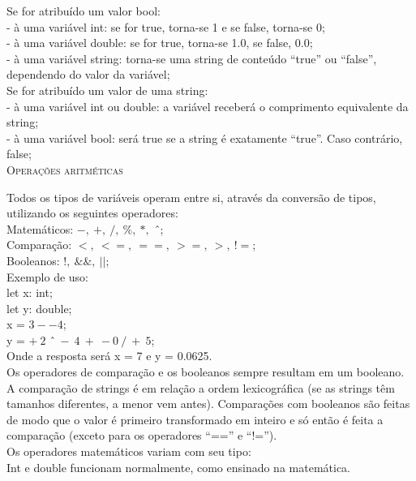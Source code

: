 \documentclass[12pt,a4paper]{article}
\begin{document}
Se for atribuído um valor bool:\\[0.15cm]
- à uma variável int: se for true, torna-se 1 e se false, torna-se 0;\\
- à uma variável double: se for true, torna-se 1.0, se false, 0.0;\\
- à uma variável string: torna-se uma string de conteúdo ``true'' ou ``false'', dependendo do valor da variável;\\[0.3cm]

Se for atribuído um valor de uma string:\\[0.15cm]
- à uma variável int ou double: a variável receberá o comprimento equivalente da string;\\
- à uma variável bool: será true se a string é exatamente ``true''. Caso contrário, false;\\

\hypertarget{label3}{\Large{\textsc{Operações aritméticas}}}\\[0.3cm]
\normalsize

Todos os tipos de variáveis operam entre si, através da conversão de tipos, utilizando os seguintes operadores:\\[0.2cm]
Matemáticos: $-,\ +,\ /,\ \%,\ *,$ \^\ ;\\
Comparação: $<,\ <=,\ ==,\ >=,\ >,\ !=$;\\
Booleanos: $!,\ \&\&,\ ||$;\\[0.6cm]
Exemplo de uso:\\[0.3cm]
let x: int;\\
let y: double;\\

x = $3--4$;\\

y = $+\ 2$ \^\ $\ -\ 4\ +\ -0\ /\ +\ 5$;\\[0.5cm]
Onde a resposta será x = 7 e y = 0.0625.\\


Os operadores de comparação e os booleanos sempre resultam em um booleano. A comparação de strings é em relação a ordem lexicográfica (se as strings têm tamanhos diferentes, a menor vem antes). Comparações com booleanos são feitas de modo que o valor é primeiro transformado em inteiro e só então é feita a comparação (exceto para os operadores ``=='' e ``!='').\\

Os operadores matemáticos variam com seu tipo:\\
Int e double funcionam normalmente, como ensinado na matemática.\\
\end{document}
